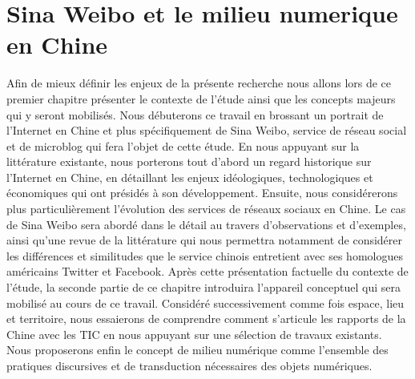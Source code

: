 \chapter{Sina Weibo et le milieu numerique en Chine} 

Afin de mieux définir les enjeux de la présente recherche nous allons lors de ce premier chapitre présenter le contexte de l’étude ainsi que les concepts majeurs qui y seront mobilisés. Nous débuterons ce travail en brossant un portrait de l’Internet en Chine et plus spécifiquement de Sina Weibo, service de réseau social et de microblog qui fera l’objet de cette étude. En nous appuyant sur la littérature existante, nous porterons tout d’abord un regard historique sur l’Internet en Chine, en détaillant les enjeux idéologiques, technologiques et économiques qui ont présidés à son développement. Ensuite, nous considérerons plus particulièrement l’évolution des services de réseaux sociaux en Chine. Le cas de Sina Weibo sera abordé dans le détail au travers d’observations et d’exemples, ainsi qu’une revue de la littérature qui nous permettra notamment de considérer les différences et similitudes que le service chinois entretient avec ses homologues américains Twitter et Facebook. Après cette présentation factuelle du contexte de l’étude, la seconde partie de ce chapitre introduira l’appareil conceptuel qui sera mobilisé au cours de ce travail. Considéré successivement comme fois espace, lieu et territoire, nous essaierons de comprendre comment s’articule les rapports de la Chine avec les TIC en nous appuyant sur une sélection de travaux existants. Nous proposerons enfin le concept de milieu numérique comme l’ensemble des pratiques discursives et de transduction nécessaires des objets numériques.

